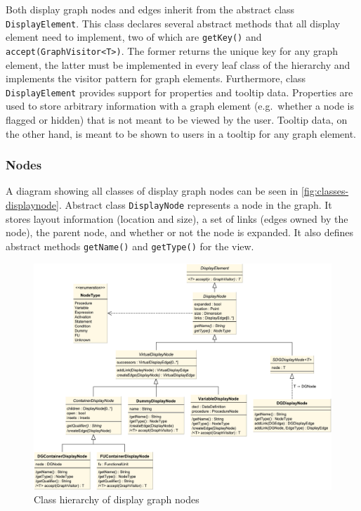 Both display graph nodes and edges inherit from the abstract class \lstinline|DisplayElement|. This class declares 
several abstract methods that all display element need to implement, two of which are \lstinline|getKey()| and 
\lstinline|accept(GraphVisitor<T>)|. The former returns the unique key for any graph element, the latter must be 
implemented in every leaf class of the hierarchy and implements the visitor pattern \cite[pp.~331--344]{designpatterns} 
for graph elements. Furthermore, class \lstinline|DisplayElement| provides support for properties and tooltip data. 
Properties are used to store arbitrary information with a graph element (e.g.\ whether a node is flagged or hidden) 
that is not meant to be viewed by the user. Tooltip data, on the other hand, is meant to be shown to users in a tooltip 
for any graph element.

\subsubsection{Nodes}

A diagram showing all classes of display graph nodes can be seen in \autoref{fig:classes-displaynode}. Abstract class 
\lstinline|DisplayNode| represents a node in the graph. It stores layout information (location and size), a set of 
links (edges owned by the node), the parent node, and whether or not the node is expanded. It also defines abstract 
methods \lstinline|getName()| and \lstinline|getType()| for the view.

\begin{figure}
  \centering
    \includegraphics[scale=0.5]{bilder/classes-displaynode}
  \caption{Class hierarchy of display graph nodes}
  \label{fig:classes-displaynode}
\end{figure}

